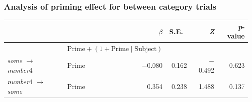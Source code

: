 \documentclass[noamssymb]{beamer}
\begin{document}
\begin{frame}

  \frametitle{{\ftf Analysis of priming effect for between category trials}}
  \begin{adjustbox}{width=1\textwidth,center=\textwidth}
    \begin{tabular}{llrrrr}
      \hline
      & & \(\beta\) & S.E.\ & \emph{Z} & \emph{p}-value  \\
      \hline
      & \multicolumn{2}{l}{\(\text{Prime} + (1 + \text{Prime} \mid \text{Subject})\)} & & & \\
      \emph{some} \(\rightarrow\) \emph{number}4 & Prime & \(-\)0.080 &  0.162 & \(-\)0.492 & 0.623 \\
      \emph{number}4 \(\rightarrow\) \emph{some} & Prime & 0.354  &  0.238 & 1.488  & 0.137 \\
      \hline
    \end{tabular}
  \end{adjustbox}
\end{frame}
\end{document}
